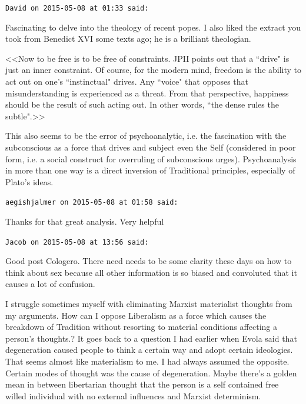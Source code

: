 \begin{footnotesize}\begin{sffamily}

\texttt{David on 2015-05-08 at 01:33 said: }

Fascinating to delve into the theology of recent popes. I also liked the extract you took from Benedict XVI some texts ago; he is a brilliant theologian. 

<<Now to be free is to be free of constraints. JPII points out that a ``drive" is just an inner constraint. Of course, for the modern mind, freedom is the ability to act out on one's ``instinctual" drives. Any ``voice" that opposes that misunderstanding is experienced as a threat. From that perspective, happiness should be the result of such acting out. In other words, ``the dense rules the subtle".>>

This also seems to be the error of psychoanalytic, i.e. the fascination with the subconscious as a force that drives and subject even the Self (considered in poor form, i.e. a social construct for overruling of subconscious urges). Psychoanalysis in more than one way is a direct inversion of Traditional principles, especially of Plato's ideas.


\hfill

\texttt{aegishjalmer on 2015-05-08 at 01:58 said: }

Thanks for that great analysis. Very helpful


\hfill

\texttt{Jacob on 2015-05-08 at 13:56 said: }

Good post Cologero. There need needs to be some clarity these days on how to think about sex because all other information is so biased and convoluted that it causes a lot of confusion. 

I struggle sometimes myself with eliminating Marxist materialist thoughts from my arguments. How can I oppose Liberalism as a force which causes the breakdown of Tradition without resorting to material conditions affecting a person's thoughts.? It goes back to a question I had earlier when Evola said that degeneration caused people to think a certain way and adopt certain ideologies. That seems almost like materialism to me. I had always assumed the opposite. Certain modes of thought was the cause of degeneration. Maybe there's a golden mean in between libertarian thought that the person is a self contained free willed individual with no external influences and Marxist determinism.


\hfill


\end{sffamily}
\end{footnotesize}
